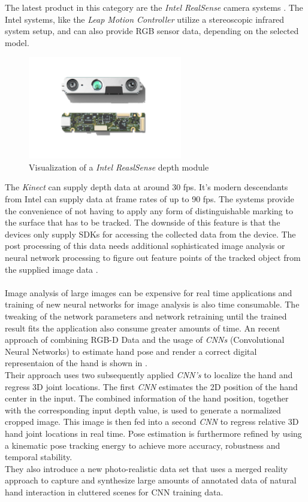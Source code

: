 The latest product in this category are the \textit{Intel RealSense} camera systems \cite{IntelCorporation.2018}. The Intel systems, like the\textit{ Leap Motion Controller} utilize a stereoscopic infrared system setup, and can also provide RGB sensor data, depending on the selected model.
\begin{figure}[H]
\centering
\includegraphics[width=0.6\textwidth]{images/RealSense.png}
\caption{Visualization of a \textit{Intel ReaslSense} depth module\cite{IntelCorporation.2018}}
\label{img:realsense} 
\end{figure}
The \textit{Kinect} can supply depth data at around 30 fps. It's modern descendants from Intel can supply data at frame rates of up to 90 fps. The systems provide the convenience of not having to apply any form of distinguishable marking to the surface that has to be tracked. The downside of this feature is that the devices only supply SDKs for accessing the collected data from the device. The post processing of this data needs additional sophisticated image analysis or neural network processing to figure out feature points of the tracked object from the supplied image data \cite{JamieShotton.2011,Oikonomidis.2011b}.
\\\\Image analysis of large images can be expensive for real time applications and training of new neural networks for image analysis is also time consumable. The tweaking of the network parameters and network retraining until the trained result fits the application also consume greater amounts of time. An recent approach of combining RGB-D Data and the usage of\textit{ CNNs} (Convolutional Neural Networks) to estimate hand pose and render a correct digital representaion of the hand is shown in \cite{Mueller.2017}.
\\Their approach uses two subsequently applied \textit{CNN's} to localize the hand and regress 3D joint locations. The first \textit{CNN} estimates the 2D position of the hand center in the input. The combined information of the hand position, together with the corresponding input depth value, is used to generate a normalized cropped image. This image is then fed into a second \textit{CNN} to regress relative 3D hand joint
locations in real time. Pose estimation is furthermore refined by using a kinematic pose tracking energy to achieve more accuracy, robustness and
temporal stability.
\\They also introduce a new photo-realistic data set that uses a merged reality approach to capture and synthesize large amounts of annotated data of natural hand interaction in cluttered scenes for CNN training data.